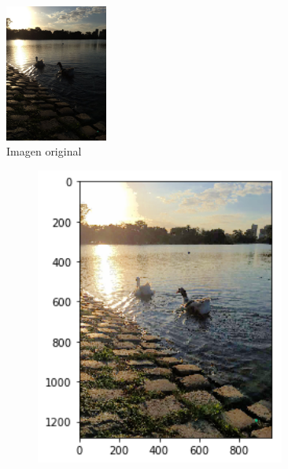 \documentclass[10pt, a4paper]{article}
\begin{document}
\begin{figure}[H]
	\centering
        \includegraphics[width=0.3\textwidth]{patitos1.jpg}
        \caption{Imagen original}
\end{figure}

\begin{figure}[H]	
	\centering
    \begin{subfigure}{0.3\textwidth}
        \includegraphics[width=0.9\textwidth]{patitos-alphabetafijos-k4.png}
    \end{subfigure}\hfill
    	\centering
    \begin{subfigure}{0.3\textwidth}

\end{subfigure}
\end{figure}
\end{document}
